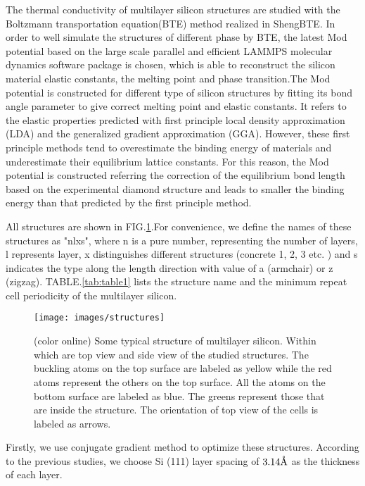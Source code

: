 \documentclass[%
 reprint,
 amsmath,amssymb,
 aps,
 prb,
]{revtex4-1}
\newcommand{\angstrom}{\mbox{\normalfont\AA}}
\begin{document}
The thermal conductivity of multilayer silicon structures are studied with the Boltzmann transportation equation(BTE) method realized in ShengBTE\cite{Li2014}. In order to well simulate the structures of different phase by BTE, the latest Mod potential\cite{Parks2007} based on the large scale parallel and efficient LAMMPS molecular dynamics software package is chosen\cite{Kumagai2007Development}, which is able to reconstruct the silicon material elastic constants, the melting point and phase transition.The Mod potential is constructed for different type of silicon structures by fitting its bond angle parameter to give correct melting point and elastic constants. It refers to the elastic properties predicted with first principle local density approximation (LDA) and the generalized gradient approximation (GGA). However, these first principle methods tend to overestimate the binding energy of materials and underestimate their equilibrium lattice constants. For this reason, the Mod potential is constructed referring the correction of the equilibrium bond length based on the experimental diamond structure and leads to smaller the binding energy than that predicted by the first principle method.

All structures are shown in FIG.\ref{fig:structures}.For convenience, we define the names of these structures as "nlxs", where n is a pure number, representing the number of layers, l represents layer, x distinguishes different structures (concrete 1, 2, 3 etc. ) and s indicates the type along the length direction with value of a (armchair) or z (zigzag). TABLE.\ref{tab:table1} lists the structure name and  the minimum repeat cell periodicity of the multilayer silicon.

\begin{figure}[b]
  \texttt{[image: images/structures]}
  \caption{\label{fig:structures}  (color online) Some typical structure of multilayer silicon. Within which  are top view and side view of the studied structures. The buckling atoms on the top surface are labeled as yellow while the red atoms represent the others on the top surface. All the atoms on the bottom surface are labeled as blue. The greens represent those that are inside the structure. The orientation of top view of the cells is labeled as arrows.}
\end{figure}

Firstly, we use conjugate gradient method to optimize these structures.  According to the previous studies, we choose Si (111) layer spacing of $3.14 \angstrom$ as the thickness of each layer.
\end{document}
